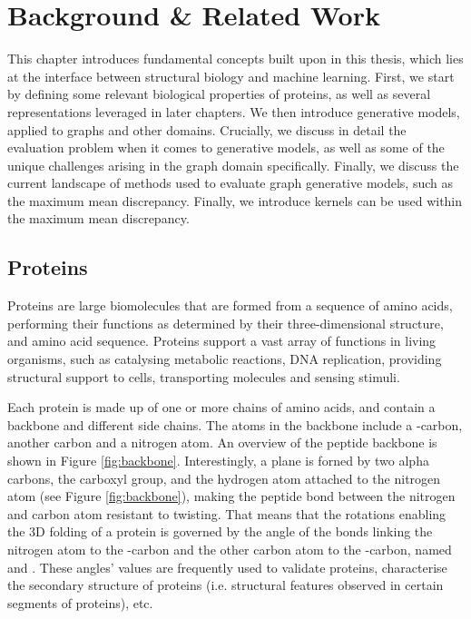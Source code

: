 
\chapter{Background \& Related Work}\label{chap:background}


This chapter introduces fundamental concepts built upon in this thesis, which
lies at the interface between structural biology and machine learning. First, we
start by defining some relevant biological properties of proteins, as well as
several representations leveraged in later chapters. We then introduce
generative models, applied to graphs and other domains. Crucially, we discuss in
detail the evaluation problem when it comes to generative models, as well as
some of the unique challenges arising in the graph domain specifically. Finally,
we discuss the current landscape of methods used to evaluate
graph generative models, such as the maximum mean discrepancy. Finally, we
introduce kernels can be used within the maximum mean discrepancy.

\section{Proteins}\label{sec:proteins}

Proteins are large biomolecules that are formed from a sequence of amino acids,
performing their functions as determined by their three-dimensional structure,
and amino acid sequence. Proteins support a vast array of functions in living
organisms, such as catalysing metabolic reactions, DNA replication, providing
structural support to cells, transporting molecules and sensing stimuli.

Each protein is made up of one or more chains of amino acids, and contain a
backbone and different side chains. The atoms in the backbone include a
\textalpha{}-carbon, another carbon and a nitrogen atom. An overview of the
peptide backbone is shown in Figure \ref{fig:backbone}. Interestingly, a plane
is forned by two alpha carbons, the carboxyl group, and the hydrogen atom
attached to the nitrogen atom (see Figure \ref{fig:backbone}), making the
peptide bond between the nitrogen and carbon atom resistant to twisting. That
means that the rotations enabling the 3D folding of a protein is governed by the
angle of the bonds linking the nitrogen atom to the \textalpha{}-carbon and the
other carbon atom to the \textalpha{}-carbon, named \textphi{} and \textpsi{}.
These angles' values are frequently used to validate proteins, characterise the
secondary structure of proteins (i.e. structural features observed in certain
segments of proteins), etc.


